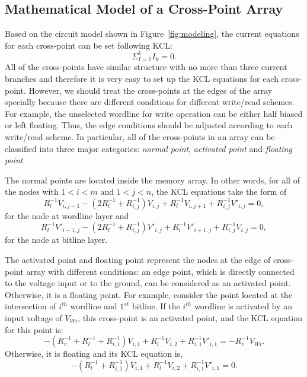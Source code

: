 \subsection{Mathematical Model of a Cross-Point Array}
Based on the circuit model shown in Figure~\ref{fig:modeling}, the current equations for each cross-point can be set following KCL:
\begin{equation}
  {\Sigma}_{I=1}^kI_k=0.
\end{equation}
 All of the cross-points have similar structure with no more than three current branches and therefore it is very easy to set up the KCL equations for each cross-point. However, we should treat the cross-points at the edges of the array specially because there are different conditions for different write/read schemes. For example, the unselected wordline for write operation can be either half biased or left floating. Thus, the edge conditions should be adjusted according to each write/read scheme. In particular, all of the cross-points in an array can be classified into three major categories: \emph{normal point}, \emph{activated point} and \emph{floating point}.

The normal points are located inside the memory array. In other words, for all of the nodes with $1<i<m$ and $1<j<n$, the KCL equations take the form of
\begin{equation}\label{equ:KCL1}
R_l^{-1}V_{i,j-1} -(2R_l^{-1}+R_{i,j}^{-1})V_{i,j}+ R_l^{-1}V_{i,j+1}+R_{i,j}^{-1}V'_{i,j}=0,
\end{equation}
for the node at wordline layer and
\begin{equation}\label{equ:KCL2}
R_l^{-1}V'_{i-1,j} -(2R_l^{-1}+R_{i,j}^{-1})V'_{i,j}+ R_l^{-1}V'_{i+1,j}+R_{i,j}^{-1}V_{i,j}=0,
\end{equation}
for the node at bitline layer.

The activated point and floating point represent the nodes at the edge of cross-point array with different conditions: an edge point, which is directly connected to the voltage input or to the ground, can be considered as an activated point. Otherwise, it is a floating point. For example, consider the point located at the intersection of $i^{th}$ wordline and $1^{st}$ bitline. If the $i^{th}$ wordline is activated by an input voltage of $V_{Wi}$, this cross-point is an activated point, and the KCL equation for this point is:
\begin{equation}\label{equ:KCL3}
-(R_v^{-1}+R_l^{-1}+R_{i,1}^{-1})V_{i,1}+ R_l^{-1}V_{i,2}+R_{i,1}^{-1}V'_{i,1}=-R_v^{-1}V_{Wi}.
\end{equation}
Otherwise, it is floating and its KCL equation is,
\begin{equation}\label{equ:KCL4}
-(R_l^{-1}+R_{i,1}^{-1})V_{i,1}+ R_l^{-1}V_{i,2}+R_{i,1}^{-1}V'_{i,1}=0.
\end{equation}

